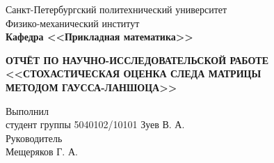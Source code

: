 \documentclass[main.tex]{subfiles}
\begin{document}
\begin{titlepage}
\begin{center}
	\begin{large}
		Санкт-Петербургский политехнический университет\\
		Физико-механический институт\\
		\textbf{Кафедра <<Прикладная математика>>}\\
	\end{large}
	\vfill
	\large{\textbf{ОТЧЁТ ПО НАУЧНО-ИССЛЕДОВАТЕЛЬСКОЙ РАБОТЕ\\
	<<СТОХАСТИЧЕСКАЯ ОЦЕНКА СЛЕДА МАТРИЦЫ \\
	МЕТОДОМ ГАУССА-ЛАНШОЦА>>}} \normalsize
\end{center}
\vfill
\flushleft
Выполнил\\
студент группы 5040102/10101
\flushright
Зуев В. А.\\
\flushleft
Руководитель\\
\flushright
Мещеряков Г. А.
\flushleft
\vfill
{}
\end{titlepage}
\end{document}
